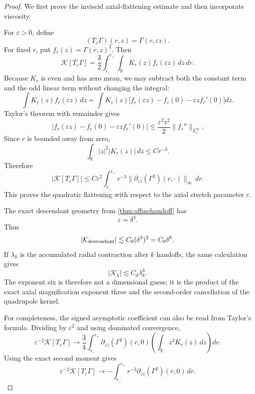 \documentclass[11pt]{article}
\theoremstyle{definition}\newtheorem{definition}[theorem]{Definition}
\theoremstyle{remark}\newtheorem{remark}[theorem]{Remark}
\newcommand{\R}{\mathbb R}\newcommand{\dd}{\,d}\newcommand{\HH}{\mathcal H}
\begin{document}
\begin{proof}
We first prove the inviscid axial-flattening estimate and then incorporate viscosity.

For $\varepsilon>0$, define
\[
 (T_\varepsilon\Gamma)(r,z)=\Gamma(r,\varepsilon z).
\]
For fixed $r$, put $f_r(z)=\Gamma(r,z)^2$.  Then
\[
 \mathcal K[T_\varepsilon\Gamma]
 =\frac32\int_{r_-}^{r_+}\int_{\R}K_r(z)f_r(\varepsilon z)\,dz\,dr.
\]
Because $K_r$ is even and has zero mean, we may subtract both the constant term and the odd linear term without changing the integral:
\[
 \int K_r(z)f_r(\varepsilon z)\,dz
 =\int K_r(z)
 \bigl[f_r(\varepsilon z)-f_r(0)-\varepsilon zf_r'(0)\bigr]dz.
\]
Taylor's theorem with remainder gives
\[
 |f_r(\varepsilon z)-f_r(0)-\varepsilon zf_r'(0)|
 \le \frac{\varepsilon^2z^2}{2}\|f_r''\|_{L^\infty_z}.
\]
Since $r$ is bounded away from zero,
\[
 \int_{\R}|z|^2|K_r(z)|\,dz\le C r^{-3}.
\]
Therefore
\[
 |\mathcal K[T_\varepsilon\Gamma]|
 \le C\varepsilon^2
 \int_{r_-}^{r_+}r^{-3}
 \|\partial_{zz}(\Gamma^2)(r,\cdot)\|_\infty\,dr.
\]
This proves the quadratic flattening with respect to the axial stretch parameter $\varepsilon$.

The exact descendant geometry from \cref{thm:affinehandoff} has
\[
 \varepsilon=\delta^3.
\]
Thus
\[
 |\mathcal K_{\rm descendant}|
 \lesssim C_0(\delta^3)^2
 =C_0\delta^6.
\]
If $\lambda_k$ is the accumulated radial contraction after $k$ handoffs, the same calculation gives
\[
 |\mathcal K_k|\lesssim C_0\lambda_k^6.
\]
The exponent six is therefore not a dimensional guess; it is the product of the exact axial magnification exponent three and the second-order cancellation of the quadrupole kernel.

For completeness, the signed asymptotic coefficient can also be read from Taylor's formula.  Dividing by $\varepsilon^2$ and using dominated convergence,
\[
 \varepsilon^{-2}\mathcal K[T_\varepsilon\Gamma]
 \longrightarrow
 \frac34\int_{r_-}^{r_+}
 \partial_{zz}(\Gamma^2)(r,0)
 \left(\int_{\R}z^2K_r(z)\,dz\right)dr.
\]
Using the exact second moment gives
\[
 \varepsilon^{-2}\mathcal K[T_\varepsilon\Gamma]
 \longrightarrow
 -\int_{r_-}^{r_+}r^{-3}
 \partial_{zz}(\Gamma^2)(r,0)\,dr.
\]


\end{proof}
\end{document}
